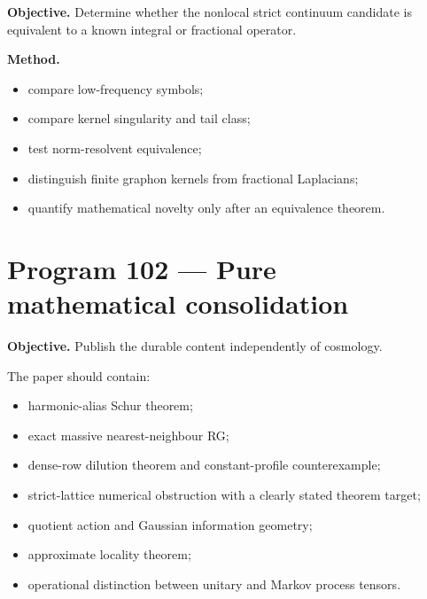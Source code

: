 \documentclass[11pt,a4paper,openany]{report}
\begin{document}
\textbf{Objective.} Determine whether the nonlocal strict continuum candidate is equivalent to a known integral or fractional operator.

\textbf{Method.}

\begin{itemize}
\item 
compare low-frequency symbols;

\item 
compare kernel singularity and tail class;

\item 
test norm-resolvent equivalence;

\item 
distinguish finite graphon kernels from fractional Laplacians;

\item 
quantify mathematical novelty only after an equivalence theorem.

\end{itemize}

\section{Program 102 --- Pure mathematical consolidation}

\textbf{Objective.} Publish the durable content independently of cosmology.

The paper should contain:

\begin{itemize}
\item 
harmonic-alias Schur theorem;

\item 
exact massive nearest-neighbour RG;

\item 
dense-row dilution theorem and constant-profile counterexample;

\item 
strict-lattice numerical obstruction with a clearly stated theorem target;

\item 
quotient action and Gaussian information geometry;

\item 
approximate locality theorem;

\item 
operational distinction between unitary and Markov process tensors.

\end{itemize}
\end{document}
